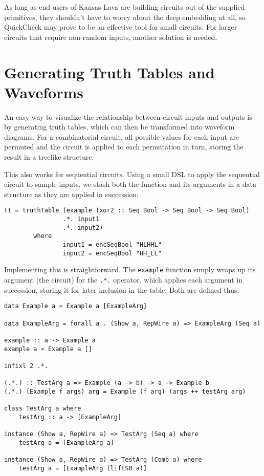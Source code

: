 \documentclass{llncs}
\begin{document}
As long as end users of Kansas Lava are building circuits out
of the supplied primitives, they shouldn't have to worry about
the deep embedding at all, so QuickCheck may prove to be an
effective tool for small circuits. For larger circuits that
require non-random inputs, another solution is needed.

\section{Generating Truth Tables and Waveforms}

An easy way to visualize the relationship between circuit inputs and
outputs is by generating truth tables, which can then be transformed
into waveform diagrams. For a combinatorial circuit, all possible
values for each input are permuted and the circuit is applied to each
permutation in turn, storing the result in a treelike structure.

This also works for sequential circuits. Using a small DSL to apply the sequential
circuit to sample inputs, we stash both the function and its arguments
in a data structure as they are applied in succession:

\begin{verbatim}
tt = truthTable (example (xor2 :: Seq Bool -> Seq Bool -> Seq Bool)
                .*. input1
                .*. input2)
        where
                input1 = encSeqBool "HLHHL"
                input2 = encSeqBool "HH_LL"
\end{verbatim}

Implementing this is straightforward. The \verb!example! function simply
wraps up its argument (the circuit) for the \verb!.*.! operator, which applies
each argument in succession, storing it for later inclusion in the table. Both
are defined thus:

\begin{verbatim}
data Example a = Example a [ExampleArg]

data ExampleArg = forall a . (Show a, RepWire a) => ExampleArg (Seq a)

example :: a -> Example a
example a = Example a []

infixl 2 .*.

(.*.) :: TestArg a => Example (a -> b) -> a -> Example b
(.*.) (Example f args) arg = Example (f arg) (args ++ testArg arg)

class TestArg a where
    testArg :: a -> [ExampleArg]

instance (Show a, RepWire a) => TestArg (Seq a) where
    testArg a = [ExampleArg a]

instance (Show a, RepWire a) => TestArg (Comb a) where
    testArg a = [ExampleArg (liftS0 a)]
\end{verbatim}
\end{document}
